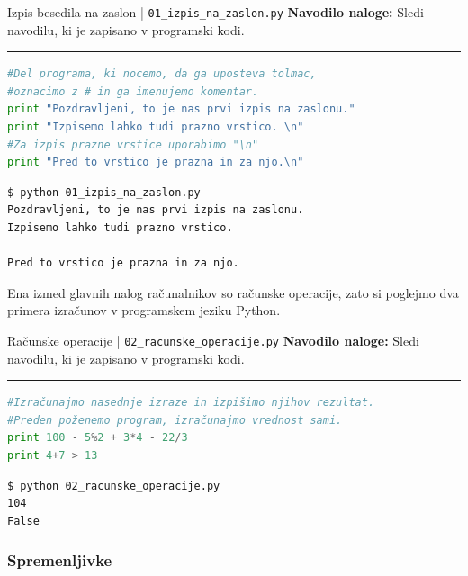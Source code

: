 \begin{examplebox}[label={prog:izpis}]{Izpis besedila na zaslon |
    \texttt{01\_izpis\_na\_zaslon.py} \cite{web:PTHardWay}}
  \textbf{Navodilo naloge:} Sledi navodilu, ki je zapisano v programski
  kodi.
\rule{\textwidth}{.4pt}
\begin{lstlisting}[language=Python]
#Del programa, ki nocemo, da ga uposteva tolmac,
#oznacimo z # in ga imenujemo komentar.
print "Pozdravljeni, to je nas prvi izpis na zaslonu."
print "Izpisemo lahko tudi prazno vrstico. \n"
#Za izpis prazne vrstice uporabimo "\n"
print "Pred to vrstico je prazna in za njo.\n"
\end{lstlisting}
\tcblower
\begin{Verbatim}[fontsize=\footnotesize]
$ python 01_izpis_na_zaslon.py
Pozdravljeni, to je nas prvi izpis na zaslonu.
Izpisemo lahko tudi prazno vrstico.

Pred to vrstico je prazna in za njo.
\end{Verbatim}
\end{examplebox}

Ena izmed glavnih nalog računalnikov so računske operacije, zato si
poglejmo dva primera izračunov v programskem jeziku Python.

\begin{examplebox}[label={prog:racunske_operacije}]{Računske operacije |
    \texttt{02\_racunske\_operacije.py} \cite{web:PTHardWay}}
  \textbf{Navodilo naloge:} Sledi navodilu, ki je zapisano v programski
  kodi.
\rule{\textwidth}{.4pt}
\begin{lstlisting}[language=Python]
#Izračunajmo nasednje izraze in izpišimo njihov rezultat.
#Preden poženemo program, izračunajmo vrednost sami.
print 100 - 5%2 + 3*4 - 22/3
print 4+7 > 13
\end{lstlisting}
\tcblower
\begin{Verbatim}[fontsize=\footnotesize]
$ python 02_racunske_operacije.py
104
False
\end{Verbatim}
\end{examplebox}

\subsubsection{Spremenljivke}
\label{sec:spremenljivke}

